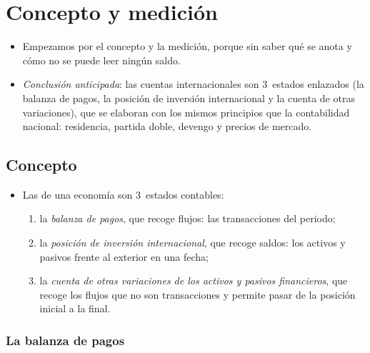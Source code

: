 \documentclass[11pt]{article}
\begin{document}
\section{Concepto y medición}\label{sec:concepto-medicion}

\begin{itemize}
\item Empezamos por el concepto y la medición, porque sin saber qué se anota y cómo no se puede leer ningún saldo.
\item \emph{Conclusión anticipada}: las cuentas internacionales son 3~estados enlazados (la balanza de pagos, la posición de inversión internacional y la cuenta de otras variaciones), que se elaboran con los mismos principios que la contabilidad nacional: residencia, partida doble, devengo y precios de mercado.
\end{itemize}

\subsection{Concepto}\label{sec:concepto}

\begin{itemize}
\item Las  de una economía son 3~estados contables\nocite{FMI2009MBP6}:
  \begin{enumerate}
  \item la \emph{balanza de pagos}, que recoge flujos: las transacciones del periodo;
  \item la \emph{posición de inversión internacional}, que recoge saldos: los activos y pasivos frente al exterior en una fecha;
  \item la \emph{cuenta de otras variaciones de los activos y pasivos financieros}, que recoge los flujos que no son transacciones y permite pasar de la posición inicial a la final.
  \end{enumerate}
\end{itemize}

\subsubsection{La balanza de pagos}\label{sec:concepto-bp}
\end{document}

